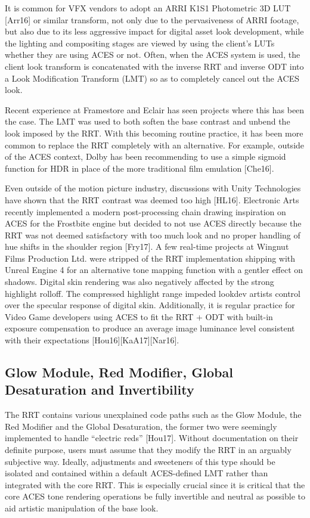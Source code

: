 \documentclass[conference]{IEEEtran}
\begin{document}
It is common for VFX vendors to adopt an ARRI K1S1 Photometric 3D LUT [Arr16] or similar transform, not only due to the pervasiveness of ARRI footage, but also due to its less aggressive impact for digital asset look development, while the lighting and compositing stages are viewed by using the client's LUTs whether they are using ACES or not. Often, when the ACES system is used, the client look transform is concatenated with the inverse RRT and inverse ODT into a Look Modification Transform (LMT) so as to completely cancel out the ACES look.

Recent experience at Framestore and Eclair has seen projects where this has been the case. The LMT was used to both soften the base contrast and unbend the look imposed by the RRT. With this becoming routine practice, it has been more common to replace the RRT completely with an alternative. For example, outside of the ACES context, Dolby has been recommending to use a simple sigmoid function for HDR in place of the more traditional film emulation [Che16].

Even outside of the motion picture industry, discussions with Unity Technologies have shown that the RRT contrast was deemed too high [HL16]. Electronic Arts recently implemented a modern post-processing chain drawing inspiration on ACES for the Frostbite engine but decided to not use ACES directly because the RRT was not deemed satisfactory with too much look and no proper handling of hue shifts in the shoulder region [Fry17]. A few real-time projects at Wingnut Films Production Ltd. were stripped of the RRT implementation shipping with Unreal Engine 4 for an alternative tone mapping function with a gentler effect on shadows. Digital skin rendering was also negatively affected by the strong highlight rolloff. The compressed highlight range impeded lookdev artists control over the specular response of digital skin. Additionally, it is regular practice for Video Game developers using ACES to fit the RRT + ODT with built-in exposure compensation to produce an average image luminance level consistent with their expectations [Hou16][KaA17][Nar16].

\subsection{Glow Module, Red Modifier, Global Desaturation and Invertibility}
The RRT contains various unexplained code paths such as the Glow Module, the Red Modifier and the Global Desaturation, the former two were seemingly implemented to handle “electric reds” [Hou17]. Without documentation on their definite purpose, users must assume that they modify the RRT in an arguably subjective way. Ideally, adjustments and sweeteners of this type should be isolated and contained within a default ACES-defined LMT rather than integrated with the core RRT. This is especially crucial since it is critical that the core ACES tone rendering operations be fully invertible and neutral as possible to aid artistic manipulation of the base look.
\end{document}
